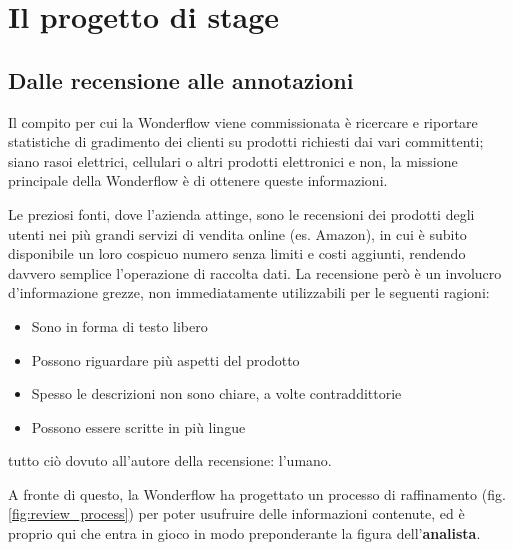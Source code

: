 
\chapter{Il progetto di stage}
\label{cap:progetto-stage}

\section{Dalle recensione alle annotazioni}
Il compito per cui la Wonderflow viene commissionata è ricercare e riportare
statistiche di gradimento dei clienti su prodotti richiesti dai vari
committenti; siano rasoi elettrici, cellulari o altri prodotti elettronici e
non, la missione principale della Wonderflow è di ottenere queste informazioni.

Le preziosi fonti, dove l'azienda attinge, sono le recensioni dei prodotti
degli utenti nei più grandi servizi di vendita online (es. Amazon), in cui è
subito disponibile un loro cospicuo numero senza limiti e costi aggiunti,
rendendo davvero semplice l'operazione di raccolta dati. La recensione
però è un involucro d'informazione grezze, non immediatamente utilizzabili per le seguenti
ragioni:
\begin{itemize}
\item Sono in forma di testo libero
\item Possono riguardare più aspetti del prodotto
\item Spesso le descrizioni non sono chiare, a volte contraddittorie
\item Possono essere scritte in più lingue
\end{itemize}

tutto ciò dovuto all'autore della recensione: l'umano.

A fronte di questo, la Wonderflow ha progettato un processo di raffinamento
(fig. \ref{fig:review_process}) per poter usufruire delle informazioni
contenute, ed è proprio qui che entra in gioco in modo preponderante la figura
dell'\textbf{analista}.

